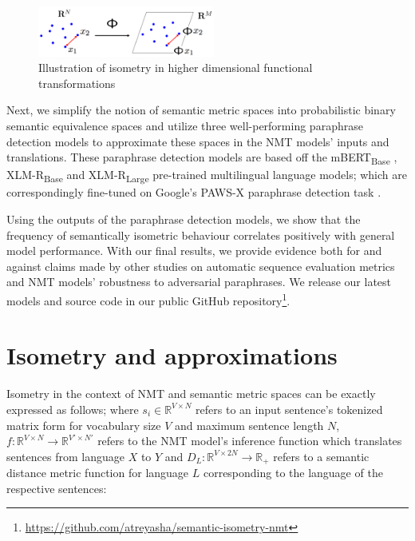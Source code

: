 \documentclass[11pt,a4paper]{article}
\begin{document}
\begin{figure}
  \centering
  \includegraphics[trim={0cm 0cm 0cm 0cm},clip,width=0.52\textwidth]{isometry_visualized.png}
  \caption{Illustration of isometry in higher dimensional functional transformations \citep{Hegde-Numax}}
  \label{isometry_visual}
\end{figure}

Next, we simplify the notion of semantic metric spaces into probabilistic binary semantic equivalence spaces and utilize three well-performing paraphrase detection models to approximate these spaces in the NMT models' inputs and translations. These paraphrase detection models are based off the mBERT\textsubscript{Base} \cite{devlin-etal-2019-bert}, XLM-R\textsubscript{Base} \cite{conneau2019unsupervised} and XLM-R\textsubscript{Large} \cite{conneau2019unsupervised} pre-trained multilingual language models; which are correspondingly fine-tuned on Google's PAWS-X paraphrase detection task \cite{pawsx2019emnlp, hu2020xtreme}.
 
Using the outputs of the paraphrase detection models, we show that the frequency of semantically isometric behaviour correlates positively with general model performance. With our final results, we provide evidence both for and against claims made by other studies on automatic sequence evaluation metrics and NMT models' robustness to adversarial paraphrases. We release our latest models and source code in our public GitHub repository\footnote{\url{https://github.com/atreyasha/semantic-isometry-nmt}}.

\section{Isometry and approximations}

Isometry in the context of NMT and semantic metric spaces can be exactly expressed as follows; where $s_i \in \mathbb{R}^{V \times N}$ refers to an input sentence's tokenized matrix form for vocabulary size $V$ and maximum sentence length $N$, $f: \mathbb{R}^{V \times N} \to \mathbb{R}^{V' \times N'}$ refers to the NMT model's inference function which translates sentences from language $X$ to $Y$ and $D_L: \mathbb{R}^{V \times 2N} \to \mathbb{R}_+$ refers to a semantic distance metric function for language $L$ corresponding to the language of the respective sentences:
\end{document}
